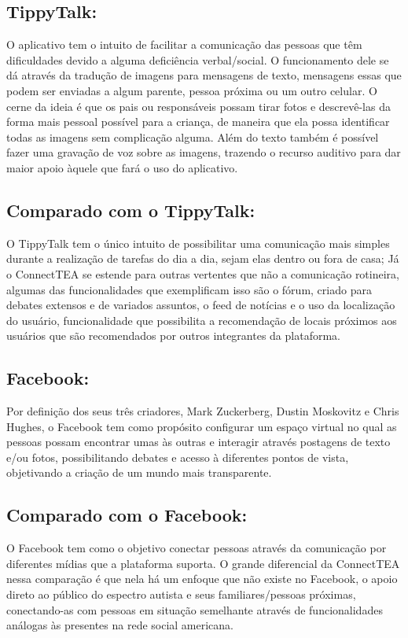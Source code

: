\begin{apendicesenv}
	
	\subsection{TippyTalk:}
	O aplicativo tem o intuito de facilitar a comunicação das pessoas que têm dificuldades devido a alguma deficiência verbal/social. O funcionamento dele se dá através da tradução de imagens para mensagens de texto, mensagens essas que podem ser enviadas a algum parente, pessoa próxima ou um outro celular.
	O cerne da ideia é que os pais ou responsáveis possam tirar fotos e descrevê-las da forma mais pessoal possível para a criança, de maneira que ela possa identificar todas as imagens sem complicação alguma.
	Além do texto também é possível fazer uma gravação de voz sobre as imagens, trazendo o recurso auditivo para dar maior apoio àquele que fará o uso do aplicativo.
	
	\subsection{Comparado com o TippyTalk:}
	O TippyTalk tem o único intuito de possibilitar uma comunicação mais simples durante a realização de tarefas do dia a dia, sejam elas dentro ou fora de casa; Já o ConnectTEA se estende para outras vertentes que não a comunicação rotineira, algumas das funcionalidades que exemplificam isso são o fórum, criado para debates extensos e de variados assuntos, o feed de notícias e o uso da localização do usuário, funcionalidade que possibilita a recomendação de locais próximos aos usuários que são recomendados por outros integrantes da plataforma.
	
	
	\subsection{Facebook:}
	Por definição dos seus três criadores, Mark Zuckerberg, Dustin Moskovitz e Chris Hughes, o Facebook tem como propósito configurar um espaço virtual no qual as pessoas possam encontrar umas às outras e interagir através postagens de texto e/ou fotos, possibilitando debates e acesso à diferentes pontos de vista, objetivando a criação de um mundo mais transparente.
	
	\subsection{Comparado com o Facebook:}
	O Facebook tem como o objetivo conectar pessoas através da comunicação por diferentes mídias que a plataforma suporta. O grande diferencial da ConnectTEA nessa comparação é que nela há um enfoque que não existe no Facebook, o apoio direto ao público do espectro autista e seus familiares/pessoas próximas, conectando-as com pessoas em situação semelhante através de funcionalidades análogas às presentes na rede social americana.
	

\end{apendicesenv}
